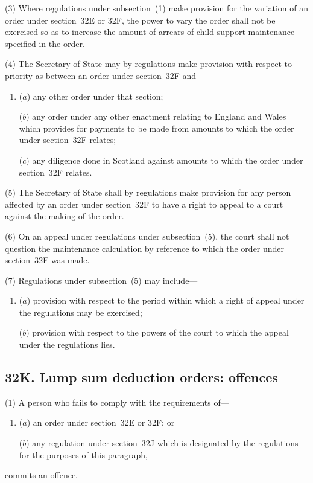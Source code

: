 \documentclass[12pt,a4paper]{article}
\begin{document}
(3)
Where regulations under subsection~(1) make provision for the variation of an order under section~32E or 32F, the power to vary the order shall not be exercised so as to increase the amount of arrears of child support maintenance specified in the order.

(4)
The Secretary of State may by regulations make provision with respect to priority as between an order under section~32F and---
\begin{enumerate}\item[]
($a$) any other order under that section;

($b$) any order under any other enactment relating to England and Wales which provides for payments to be made from amounts to which the order under section~32F relates;

($c$) any diligence done in Scotland against amounts to which the order under section~32F relates.
\end{enumerate}

(5)
The Secretary of State shall by regulations make provision for any person affected by an order under section~32F to have a right to appeal to a court against the making of the order.

(6)
On an appeal under regulations under subsection~(5), the court shall not question the maintenance calculation by reference to which the order under section~32F was made.

(7)
Regulations under subsection~(5) may include---
\begin{enumerate}\item[]
($a$) provision with respect to the period within which a right of appeal under the regulations may be exercised;

($b$) provision with respect to the powers of the court to which the appeal under the regulations lies.
\end{enumerate}


\subsection{32K. Lump sum deduction orders: offences}

(1) A person who fails to comply with the requirements of---
\begin{enumerate}\item[]
($a$) an order under section~32E or 32F; or

($b$) any regulation under section~32J which is designated by the regulations for the purposes of this paragraph,
\end{enumerate}
commits an offence.
\end{document}
